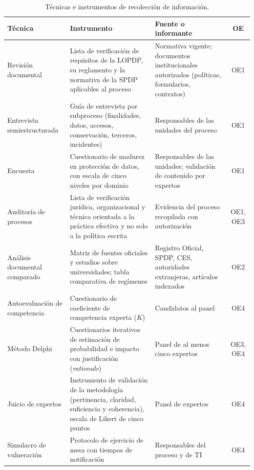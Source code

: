 \begin{table}[htbp]
  \centering
  \caption{Técnicas e instrumentos de recolección de información.}
  \label{tab:tecnicas}
  \footnotesize
  \renewcommand{\arraystretch}{1.2}
  \begin{tabularx}{\textwidth}{|p{2.6cm}|L|p{3.0cm}|c|}
    \hline
    \textbf{Técnica} & \textbf{Instrumento} & \textbf{Fuente o informante} & \textbf{OE} \\
    \hline
    Revisión documental & Lista de verificación de requisitos de la LOPDP, su reglamento y la normativa de la SPDP aplicables al proceso & Normativa vigente; documentos institucionales autorizados (políticas, formularios, contratos) & OE1 \\
    \hline
    Entrevista semiestructurada & Guía de entrevista por subproceso (finalidades, datos, accesos, conservación, terceros, incidentes) & Responsables de las unidades del proceso & OE1 \\
    \hline
    Encuesta & Cuestionario de madurez en protección de datos, con escala de cinco niveles por dominio & Responsables de las unidades; validación de contenido por expertos & OE1 \\
    \hline
    Auditoría de procesos & Lista de verificación jurídica, organizacional y técnica orientada a la práctica efectiva y no solo a la política escrita & Evidencia del proceso recopilada con autorización & OE1, OE3 \\
    \hline
    Análisis documental comparado & Matriz de fuentes oficiales y estudios sobre universidades; tabla comparativa de regímenes & Registro Oficial, SPDP, CES, autoridades extranjeras, artículos indexados & OE2 \\
    \hline
    Autoevaluación de competencia & Cuestionario de coeficiente de competencia experta ($K$) & Candidatos al panel & OE4 \\
    \hline
    Método Delphi & Cuestionarios iterativos de estimación de probabilidad e impacto con justificación (\textit{rationale}) & Panel de al menos cinco expertos & OE3, OE4 \\
    \hline
    Juicio de expertos & Instrumento de validación de la metodología (pertinencia, claridad, suficiencia y coherencia), escala de Likert de cinco puntos & Panel de expertos & OE4 \\
    \hline
    Simulacro de vulneración & Protocolo de ejercicio de mesa con tiempos de notificación & Responsables del proceso y de TI & OE4 \\
    \hline
  \end{tabularx}
  \raggedright
\end{table}

